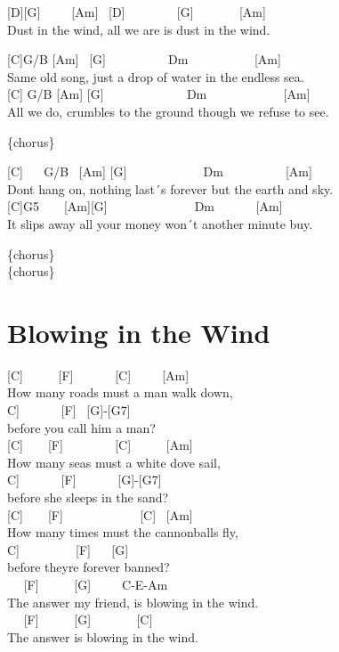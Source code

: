 \documentclass[
  letterpaper,
  twoside=false]{scrbook}
\begin{document}
{[}D{]}{[}G{]} ~ ~ ~{[}Am{]} ~{[}D{]} ~ ~ ~ ~ ~{[}G{]} ~ ~ ~ ~
{[}Am{]}\\
Dust in the wind, all we are is dust in the wind.

{[}C{]}G/B {[}Am{]} ~{[}G{]} ~ ~ ~ ~ ~ ~Dm ~ ~ ~ ~ ~ ~ {[}Am{]}\\
Same old song, just a drop of water in the endless sea.\\
{[}C{]} G/B {[}Am{]} {[}G{]} ~ ~ ~ ~ ~ ~ ~ ~Dm ~ ~ ~ ~ ~ ~ ~ {[}Am{]}\\
All we do, crumbles to the ground though we refuse to see.

\{chorus\}

{[}C{]} ~ ~G/B ~{[}Am{]} {[}G{]} ~ ~ ~ ~ ~ ~ ~ Dm ~ ~ ~ ~ ~ ~{[}Am{]}\\
Don\textquotesingle t hang on, nothing last´s forever but the earth and
sky.\\
{[}C{]}G5 ~ ~ {[}Am{]}{[}G{]} ~ ~ ~ ~ ~ ~ ~ ~ Dm ~ ~ ~ ~{[}Am{]}\\
It slips away all your money won´t another minute buy.

\{chorus\}\\
\{chorus\}

\hypertarget{blowing-in-the-wind}{%
\chapter{Blowing in the Wind}\label{blowing-in-the-wind}}

{[}C{]} ~ ~ ~ {[}F{]} ~ ~ ~ ~{[}C{]} ~ ~ ~{[}Am{]}\\
How many roads must a man walk down,\\
\hspace*{0.333em}{[}C{]} ~ ~ ~ ~{[}F{]} ~{[}G{]}-{[}G7{]}\\
before you call him a man?\\
{[}C{]} ~ ~ {[}F{]} ~ ~ ~ ~ ~{[}C{]} ~ ~ ~ {[}Am{]}\\
How many seas must a white dove sail,\\
\hspace*{0.333em}{[}C{]} ~ ~ ~ ~{[}F{]} ~ ~ ~ ~{[}G{]}-{[}G7{]}\\
before she sleeps in the sand?\\
{[}C{]} ~ ~ {[}F{]} ~ ~ ~ ~ ~ ~ ~ {[}C{]} ~{[}Am{]}\\
How many times must the cannonballs fly,\\
\hspace*{0.333em}{[}C{]} ~ ~ ~ ~ ~ {[}F{]} ~ ~{[}G{]}\\
before they\textquotesingle re forever banned?\\
\hspace*{0.333em} ~ ~{[}F{]} ~ ~ ~ {[}G{]} ~ ~ ~C-E-Am ~ ~ ~ ~ ~ ~\\
The answer my friend, is blowing in the wind.\\
\hspace*{0.333em} ~ ~{[}F{]} ~ ~ ~ {[}G{]} ~ ~ ~ ~ {[}C{]}\\
The answer is blowing in the wind.
\end{document}

